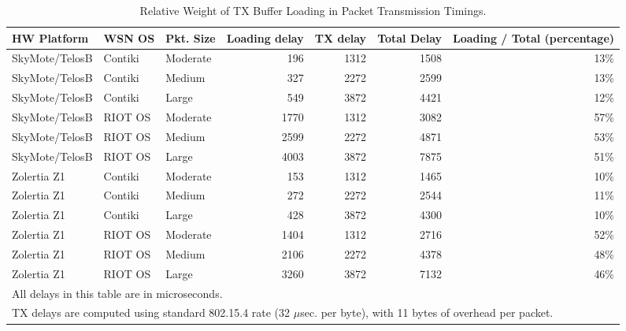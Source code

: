 \documentclass[10pt]{ewsn-proc}
\begin{document}
\begin{table*}[htbp]
\caption{Relative Weight of TX Buffer Loading in Packet Transmission Timings.}
\label{TblTXRelWeight}
\centering

\begin{tabular}{l|l|l|r|r|r|r}
\hline
HW Platform & WSN OS  & Pkt. Size
                  & Loading delay & TX delay & Total Delay
                  & Loading / Total (percentage) \\
\hline
SkyMote/TelosB    & Contiki & Moderate
                  &   196      & 1312     & 1508
                  & 13\% \\
SkyMote/TelosB    & Contiki & Medium
                  &   327      & 2272     & 2599
                  & 13\% \\
SkyMote/TelosB    & Contiki & Large
                  &   549      & 3872     & 4421
                  & 12\% \\
\hline
SkyMote/TelosB    & RIOT OS & Moderate
                  &  1770      & 1312     & 3082
                  & 57\% \\
SkyMote/TelosB    & RIOT OS & Medium
                  &  2599      & 2272     & 4871
                  & 53\% \\
SkyMote/TelosB    & RIOT OS & Large
                  &  4003      & 3872     & 7875
                  & 51\% \\
\hline
Zolertia Z1       & Contiki & Moderate
                  &   153      & 1312     & 1465
                  & 10\% \\
Zolertia Z1       & Contiki & Medium
                  &   272      & 2272     & 2544
                  & 11\% \\
Zolertia Z1       & Contiki & Large
                  &   428      & 3872     & 4300
                  & 10\% \\
\hline
Zolertia Z1       & RIOT OS & Moderate
                  &  1404      & 1312     & 2716
                  & 52\% \\
Zolertia Z1       & RIOT OS & Medium
                  &  2106   & 2272        & 4378
                  & 48\% \\
Zolertia Z1       & RIOT OS & Large
                  &  3260   & 3872        & 7132
                  & 46\% \\
\hline
\multicolumn{7}{l}{All delays in this table are in microseconds.}\\
\multicolumn{7}{l}{TX delays are computed using standard 802.15.4 rate
(32 $\mu$sec. per byte), with 11 bytes of overhead per packet.}\\
\end{tabular}
\end{table*}
\end{document}
